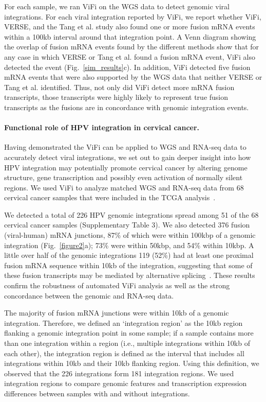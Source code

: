 \documentclass{bmcart}
\begin{document}
For each sample, we ran ViFi on the WGS data to detect genomic viral
integrations.  For each viral integration reported by ViFi, we report
whether ViFi, VERSE, and the Tang et al. study also found one or more
fusion mRNA events within a 100kb interval around that integration
point.  A Venn diagram showing the overlap of fusion mRNA events found
by the different methods show that for any case in which VERSE or Tang
et al. found a fusion mRNA event, ViFi also detected the event
(Fig.~\ref{sim_results}c).  In addition, ViFi detected five fusion
mRNA events that were also supported by the WGS data that neither
VERSE or Tang et al. identified.  Thus, not only did ViFi detect more
mRNA fusion transcripts, those transcripts were highly likely to
represent true fusion transcripts as the fusions are in concordance
with genomic integration events.

\paragraph{\textbf{Functional role of HPV integration in cervical cancer.}}  Having
demonstrated the ViFi can be applied to WGS and RNA-seq data to
accurately detect viral integrations, we set out to gain deeper
insight into how HPV integration may potentially promote cervical
cancer by altering genome structure, gene transcription and possibly
even activation of normally silent regions. We used ViFi to analyze
matched WGS and RNA-seq data from 68 cervical cancer samples
that were included in the TCGA analysis~\cite{TCGA}.

We detected a total of 226 HPV genomic integrations spread among 51 of
the 68 cervical cancer samples (Supplementary Table 3).  We also detected 376 fusion
(viral-human) mRNA junctions, 87\% of which were within 100kbp of a
genomic integration (Fig.~\ref{figure2}a); 73\% were within
50kbp, and 54\% within 10kbp. A little over half of the genomic
integrations 119 (52\%) had at least one proximal fusion mRNA sequence
within 10kb of the integration, suggesting that some of these fusion
transcripts may be mediated by alternative splicing~\cite{Ziegert2003,Johansson2013}.  
These results confirm the robustness of automated ViFi analysis as well as the strong
concordance between the genomic and RNA-seq data.

The majority of fusion mRNA junctions were within 10kb of a genomic
integration. Therefore, we defined an `integration region' as the 10kb
region flanking a genomic integration point in some sample; if a
sample contains more than one integration within a region (i.e.,
multiple integrations within 10kb of each other), the integration
region is defined as the interval that includes all integrations
within 10kb and their 10kb flanking region.  Using this definition, we
observed that the 226 integrations form 181 integration regions.  We
used integration regions to compare genomic features and transcription
expression differences between samples with and without integrations.
\end{document}
